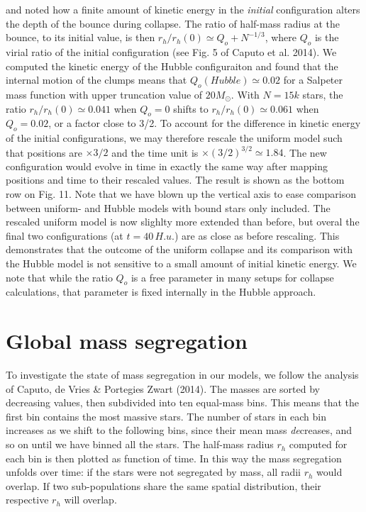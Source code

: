 \cite{caputo14} and \cite{theis99} noted how a finite amount of kinetic energy in the {\it initial} configuration alters the  depth of the bounce during collapse. The ratio of half-mass radius at the bounce, to its initial value, is then $ r_h/r_h(0) \simeq Q_o + N^{-1/3}$, where $Q_o$ is the virial ratio of the initial configuration (see Fig. 5 of Caputo et al. 2014). We computed the kinetic energy of the  Hubble configuraiton and found that the internal motion of the clumps means that $Q_o (Hubble) \simeq 0.02$ for a Salpeter mass function with upper truncation value of $20 M_\odot$. With $N = 15k$ stars, the ratio $r_h/r_h(0) \simeq 0.041$ when $Q_o = 0$ shifts to $r_h/r_h(0) \simeq 0.061$ when $Q_o = 0.02$, or a factor close to 3/2. To account for the difference in kinetic energy of the initial configurations, we may therefore rescale the uniform model such that positions are  $ \times 3/2$ and the time unit is $\times (3/2)^{3/2} \simeq 1.84$. The new configuration would evolve in time in exactly the same way after mapping positions and time to their rescaled values. The result is shown as the bottom row on Fig. 11.  Note that we  have blown up the vertical axis to ease comparison between uniform- and Hubble models with bound stars only included. The rescaled uniform model is now slighlty more extended than before, but overal the final two configurations (at $t = 40 \,H.u.$) are as close as before rescaling. This demonstrates that  the outcome of the uniform collapse and its comparison with the Hubble model is not sensitive to a small amount of initial kinetic energy. We note that while the ratio $Q_o$ is a free parameter in many setups for collapse calculations, that parameter is fixed internally in the Hubble approach. 










\section{Global mass segregation}
\label{Sec:Segregation} 


To investigate the state of mass segregation in our models, we follow the analysis of Caputo, de Vries \& Portegies Zwart (2014). The masses are sorted by decreasing values, then subdivided into ten equal-mass bins. This means that the first bin contains the most massive stars. The number of stars in each bin increases as we shift to the following bins, since their mean mass {\it de}creases, and so on until we have binned all the stars. The half-mass radius $r_h$ computed for each bin is then plotted as function of time. In this way the mass segregation unfolds over time: if the stars were not segregated by mass, all radii $r_h$ would overlap. If two sub-populations share the same spatial distribution, their respective $r_h$ will overlap.


